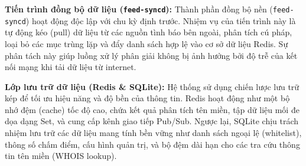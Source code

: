 \textbf{Tiến trình đồng bộ dữ liệu (\texttt{feed-syncd}):}
Thành phần đồng bộ nền (\texttt{feed-syncd}) hoạt động độc lập với chu kỳ định trước. Nhiệm vụ của tiến trình này là tự động kéo (pull) dữ liệu từ các nguồn tình báo bên ngoài, phân tích cú pháp, loại bỏ các mục trùng lặp và đẩy danh sách hợp lệ vào cơ sở dữ liệu Redis. Sự phân tách này giúp luồng xử lý phân giải không bị ảnh hưởng bởi độ trễ của kết nối mạng khi tải dữ liệu từ internet.

\textbf{Lớp lưu trữ dữ liệu (Redis \& SQLite):}
Hệ thống sử dụng chiến lược lưu trữ kép để tối ưu hiệu năng và độ bền của thông tin. Redis hoạt động như một bộ nhớ đệm (cache) tốc độ cao, chứa kết quả phân tích tên miền, tập dữ liệu mối đe dọa dạng Set, và cung cấp kênh giao tiếp Pub/Sub. Ngược lại, SQLite chịu trách nhiệm lưu trữ các dữ liệu mang tính bền vững như danh sách ngoại lệ (whitelist), thông số chấm điểm, cấu hình quản trị, và bộ đệm dài hạn cho các tra cứu thông tin tên miền (WHOIS lookup).
